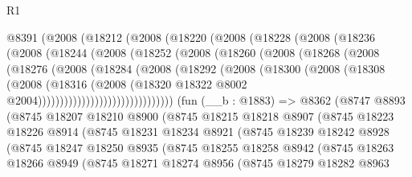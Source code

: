 \begin{lexlean}{R1}
\begin{coremodule}
    @8391
      (@2008
        (@18212
          (@2008
            (@18220
              (@2008
                (@18228
                  (@2008
                    (@18236
                      (@2008
                        (@18244
                          (@2008
                            (@18252
                              (@2008
                                (@18260
                                  (@2008
                                    (@18268
                                      (@2008
                                        (@18276
                                          (@2008
                                            (@18284
                                              (@2008
                                                (@18292
                                                  (@2008
                                                    (@18300
                                                      (@2008
                                                        (@18308
                                                          (@2008
                                                            (@18316
                                                              (@2008
                                                                (@18320
                                                                  @18322
                                                                  @8002
                                                                  @2004)))))))))))))))))))))))))))))))
    (fun (__b : @1883) =>
    @8362
      (@8747
        @8893
        (@8745
          @18207
          @18210
          @8900
          (@8745
            @18215
            @18218
            @8907
            (@8745
              @18223
              @18226
              @8914
              (@8745
                @18231
                @18234
                @8921
                (@8745
                  @18239
                  @18242
                  @8928
                  (@8745
                    @18247
                    @18250
                    @8935
                    (@8745
                      @18255
                      @18258
                      @8942
                      (@8745
                        @18263
                        @18266
                        @8949
                        (@8745
                          @18271
                          @18274
                          @8956
                          (@8745
                            @18279
                            @18282
                            @8963

\end{coremodule}
\end{lexlean}
